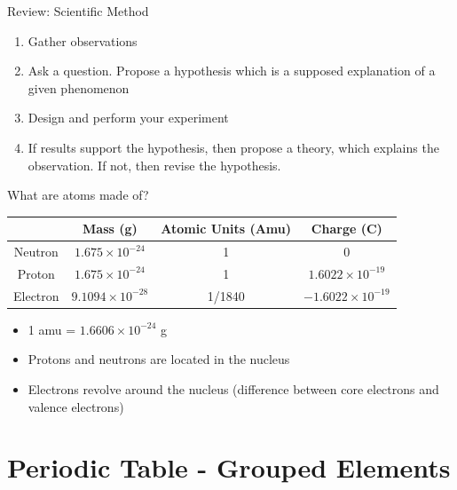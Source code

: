 \documentclass[11pt]{beamer}
\begin{document}
\begin{frame}{Review: Scientific Method}
  \begin{enumerate}
  \item Gather observations
  \item Ask a question. Propose a hypothesis
    which is a supposed explanation of a given phenomenon
  \item Design and perform your experiment
  \item If results support the hypothesis, then propose
    a theory, which explains the observation. If not, then revise
    the hypothesis.
  \end{enumerate}
\end{frame}

\begin{frame}{What are atoms made of?}
  \centering
  \begin{tabular}{c|ccc}
    & Mass (g) & Atomic Units (Amu) & Charge (C) \\
    \hline
    Neutron  & $1.675\times 10^{-24}$ & 1 & 0 \\
    Proton   & $1.675\times 10^{-24}$ & 1 & $1.6022\times 10^{-19}$ \\
    Electron & $9.1094\times 10^{-28}$ & 1/1840 & $-1.6022\times 10^{-19}$
  \end{tabular}

  \begin{itemize}
  \item 1 amu = $1.6606 \times 10^{-24}$ g
  \item Protons and neutrons are located in the nucleus
  \item Electrons revolve around the nucleus (difference between
    core electrons and valence electrons)
  \end{itemize}
\end{frame}

\section{Periodic Table - Grouped Elements}
\end{document}
